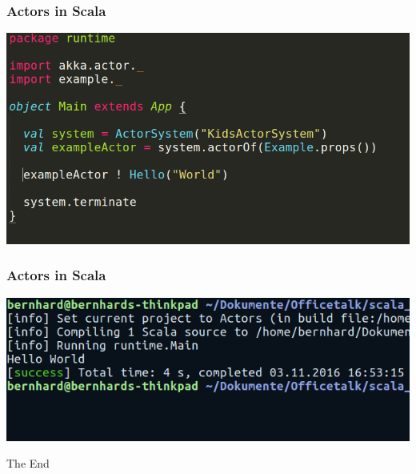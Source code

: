 \documentclass{beamer}
\begin{document}

\begin{frame}
\frametitle{Actors in Scala}
\includegraphics[width=1\linewidth]{./scala_example_main.png}
\end{frame}


\begin{frame}
\frametitle{Actors in Scala}
\includegraphics[width=1\linewidth]{./scala_example_terminal.png}
\end{frame}



\begin{frame}
\Huge{\centerline{The End}}
\end{frame}

\end{document}
